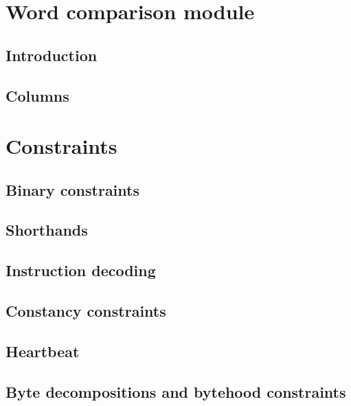 \section{Word comparison module}
\subsection{Introduction}                                          \label{wcp: intro}                    
\subsection{Columns}                                               \label{wcp: columns}                  

\section{Constraints}
\subsection{Binary constraints}                                    \label{wcp: binary}                   
\subsection{Shorthands}                                            \label{wcp: shorthands}               
\subsection{Instruction decoding}                                  \label{wcp: instruction decoding}     
\subsection{Constancy constraints}                                 \label{wcp: constancy}                
\subsection{Heartbeat}                                             \label{wcp: heartbeat}                
\subsection{Byte decompositions and bytehood constraints}          \label{wcp: byteDec and bytehood}     
